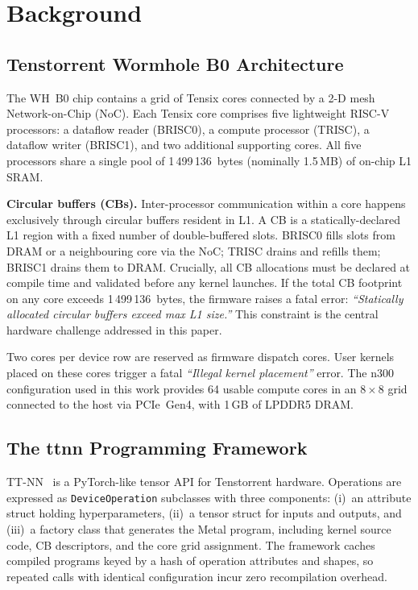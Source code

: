 \documentclass[conference]{IEEEtran}
\begin{document}
\section{Background}
\label{sec:background}

\subsection{Tenstorrent Wormhole B0 Architecture}

The WH~B0 chip contains a grid of Tensix cores connected by a 2-D mesh
Network-on-Chip (NoC). Each Tensix core comprises five lightweight RISC-V
processors: a dataflow reader (BRISC0), a compute processor (TRISC), a dataflow
writer (BRISC1), and two additional supporting cores. All five processors share
a single pool of 1\,499\,136~bytes (nominally 1.5\,MB) of on-chip L1 SRAM.

\textbf{Circular buffers (CBs).}
Inter-processor communication within a core happens exclusively through circular
buffers resident in L1. A CB is a statically-declared L1 region with a fixed
number of double-buffered slots. BRISC0 fills slots from DRAM or a neighbouring
core via the NoC; TRISC drains and refills them; BRISC1 drains them to DRAM.
Crucially, all CB allocations must be declared at compile time and validated
before any kernel launches. If the total CB footprint on any core exceeds
1\,499\,136~bytes, the firmware raises a fatal error:
\textit{``Statically allocated circular buffers exceed max L1 size.''}
This constraint is the central hardware challenge addressed in this paper.

Two cores per device row are reserved as firmware dispatch cores. User kernels
placed on these cores trigger a fatal \textit{``Illegal kernel placement''} error.
The n300 configuration used in this work provides 64 usable compute cores in an
$8 \times 8$ grid connected to the host via PCIe~Gen4, with 1\,GB of LPDDR5
DRAM.

\subsection{The ttnn Programming Framework}

TT-NN~\cite{ttmetal} is a PyTorch-like tensor API for Tenstorrent hardware.
Operations are expressed as \texttt{DeviceOperation} subclasses with three
components: (i)~an attribute struct holding hyperparameters, (ii)~a tensor
struct for inputs and outputs, and (iii)~a factory class that generates the
Metal program, including kernel source code, CB descriptors, and the core grid
assignment. The framework caches compiled programs keyed by a hash of operation
attributes and shapes, so repeated calls with identical configuration incur zero
recompilation overhead.
\end{document}
